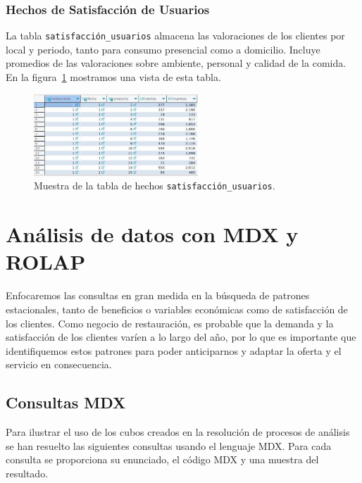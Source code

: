 \documentclass[11pt]{opticajnl}
\begin{document}
\subsubsection{Hechos de Satisfacción de Usuarios}

La tabla \texttt{satisfacción\_usuarios} almacena las valoraciones de los clientes por local y periodo, tanto para consumo presencial como a domicilio. Incluye promedios de las valoraciones sobre ambiente, personal y calidad de la comida. En la figura~\ref{fig:tablahechos3} mostramos una vista de esta tabla.

\begin{figure}[h]
    \centering
    \includegraphics[width=0.55\textwidth]{fotos/fact_ventas.jpg}
    \caption{Muestra de la tabla de hechos \texttt{satisfacción\_usuarios}.}
    \label{fig:tablahechos3}
\end{figure}











\section{Análisis de datos con MDX y ROLAP}

Enfocaremos las consultas en gran medida en la búsqueda de patrones estacionales, tanto de beneficios o variables económicas como de satisfacción de los clientes. Como negocio de restauración, es probable que la demanda y la satisfacción de los clientes varíen a lo largo del año, por lo que es importante que identifiquemos estos patrones para poder anticiparnos y adaptar la oferta y el servicio en consecuencia.

\subsection{Consultas MDX}

Para ilustrar el uso de los cubos creados en la resolución de procesos de análisis se han resuelto las siguientes consultas usando el lenguaje MDX. Para cada consulta se proporciona su enunciado, el código MDX y una muestra del resultado.
\end{document}
